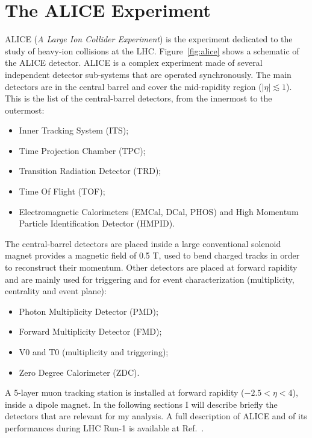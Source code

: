\documentclass[12pt, a4paper, twoside, titlepage]{article}
\begin{document}
\section{The ALICE Experiment}
ALICE (\emph{A Large Ion Collider Experiment}) is the experiment dedicated to the study of heavy-ion collisions at the LHC.
Figure~\ref{fig:alice} shows a schematic of the ALICE detector.
ALICE is a complex experiment made of several independent detector sub-systems that are operated synchronously.
The main detectors are in the central barrel and cover the mid-rapidity region ($\lvert \eta\rvert \lesssim 1$).
This is the list of the central-barrel detectors, from the innermost to the outermost:
\begin{itemize}
\item Inner Tracking System (ITS);
\item Time Projection Chamber (TPC);
\item Transition Radiation Detector (TRD);
\item Time Of Flight (TOF);
\item Electromagnetic Calorimeters (EMCal, DCal, PHOS) and High Momentum Particle Identification Detector (HMPID).
\end{itemize}
The central-barrel detectors are placed inside a large conventional solenoid magnet provides a magnetic field of 0.5 T,
used to bend charged tracks in order to reconstruct their momentum.
Other detectors are placed at forward rapidity and are mainly used for triggering and for event characterization 
(multiplicity, centrality and event plane):
\begin{itemize}
\item Photon Multiplicity Detector (PMD);
\item Forward Multiplicity Detector (FMD);
\item V0 and T0 (multiplicity and triggering);
\item Zero Degree Calorimeter (ZDC).
\end{itemize}
A 5-layer muon tracking station is installed at forward rapidity ($-2.5 < \eta < 4$), inside a dipole magnet.
In the following sections I will describe briefly the detectors that are relevant for my analysis. A full description
of ALICE and of its performances during LHC Run-1 is available at Ref.~\cite{}.\
\end{document}
